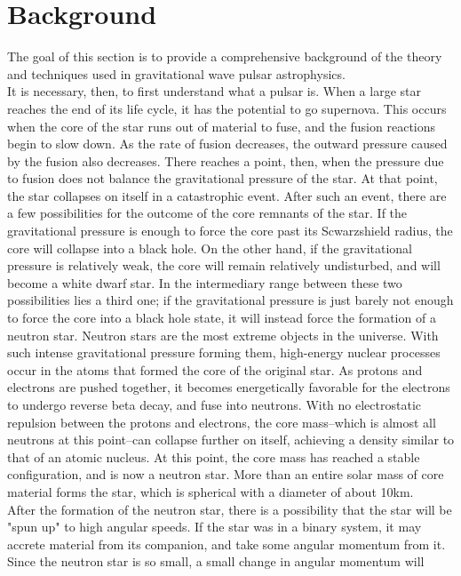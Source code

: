 \documentclass[12pt]{article}
\begin{document}
\section{Background}
The goal of this section is to provide a comprehensive background of the theory
and techniques used in gravitational wave pulsar astrophysics.
\\
It is necessary, then, to first understand what a pulsar is. When a large star
reaches the end of its life cycle, it has the potential to go supernova. This
occurs when the core of the star runs out of material to fuse, and the fusion
reactions begin to slow down. As the rate of fusion decreases, the outward
pressure caused by the fusion also decreases. There reaches a point, then, when
the pressure due to fusion does not balance the gravitational pressure of the
star. At that point, the star collapses on itself in a catastrophic event.
After such an event, there are a few possibilities for the outcome of the core
remnants of the star. If the gravitational pressure is enough to force the core
past its Scwarzshield radius, the core will collapse into a black hole. On the
other hand, if the gravitational pressure is relatively weak, the core will
remain relatively undisturbed, and will become a white dwarf star. In the
intermediary range between these two possibilities lies a third one; if the
gravitational pressure is just barely not enough to force the core into a black
hole state, it will instead force the formation of a neutron star.
Neutron stars are the most extreme objects in the universe. With such intense
gravitational pressure forming them, high-energy nuclear processes occur in the
atoms that formed the core of the original star. As protons and electrons are
pushed together, it becomes energetically favorable for the electrons to undergo
reverse beta decay, and fuse into neutrons. With no electrostatic repulsion
between the protons and electrons, the core mass--which is almost all neutrons
at this point--can collapse further on itself, achieving a density similar to
that of an atomic nucleus. At this point, the core mass has reached a stable
configuration, and is now a neutron star. More than an entire solar mass of core
material forms the star, which is spherical with a diameter of about 10km.
\\
After the formation of the neutron star, there is a possibility that the star
will be "spun up" to high angular speeds. If the star was in a binary system,
it may accrete material from its companion, and take some angular momentum from
it. Since the neutron star is so small, a small change in angular momentum will
\end{document}
